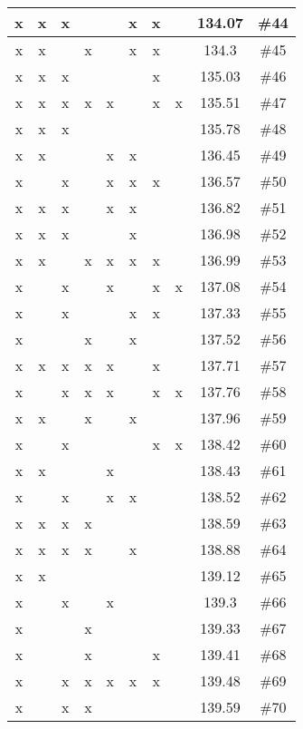 \begin{center}
\begin{longtable}{|c|c|c|c|c|c|c|c|c|c|}
 x &  x &  x &  &  &  x &  x &  & 134.07 & \#44 \\ \hline
 x &  x &  &  x &  &  x &  x &  & 134.3 & \#45 \\ \hline
 x &  x &  x &  &  &  &  x &  & 135.03 & \#46 \\ \hline
 x &  x &  x &  x &  x &  &  x &  x & 135.51 & \#47 \\ \hline
 x &  x &  x &  &  &  &  &  & 135.78 & \#48 \\ \hline
 x &  x &  &  &  x &  x &  &  & 136.45 & \#49 \\ \hline
 x &  &  x &  &  x &  x &  x &  & 136.57 & \#50 \\ \hline
 x &  x &  x &  &  x &  x &  &  & 136.82 & \#51 \\ \hline
 x &  x &  x &  &  &  x &  &  & 136.98 & \#52 \\ \hline
 x &  x &  &  x &  x &  x &  x &  & 136.99 & \#53 \\ \hline
 x &  &  x &  &  x &  &  x &  x & 137.08 & \#54 \\ \hline
 x &  &  x &  &  &  x &  x &  & 137.33 & \#55 \\ \hline
 x &  &  &  x &  &  x &  &  & 137.52 & \#56 \\ \hline
 x &  x &  x &  x &  x &  &  x &  & 137.71 & \#57 \\ \hline
 x &  &  x &  x &  x &  &  x &  x & 137.76 & \#58 \\ \hline
 x &  x &  &  x &  &  x &  &  & 137.96 & \#59 \\ \hline
 x &  &  x &  &  &  &  x &  x & 138.42 & \#60 \\ \hline
 x &  x &  &  &  x &  &  &  & 138.43 & \#61 \\ \hline
 x &  &  x &  &  x &  x &  &  & 138.52 & \#62 \\ \hline
 x &  x &  x &  x &  &  &  &  & 138.59 & \#63 \\ \hline
 x &  x &  x &  x &  &  x &  &  & 138.88 & \#64 \\ \hline
 x &  x &  &  &  &  &  &  & 139.12 & \#65 \\ \hline
 x &  &  x &  &  x &  &  &  & 139.3 & \#66 \\ \hline
 x &  &  &  x &  &  &  &  & 139.33 & \#67 \\ \hline
 x &  &  &  x &  &  &  x &  & 139.41 & \#68 \\ \hline
 x &  &  x &  x &  x &  x &  x &  & 139.48 & \#69 \\ \hline
 x &  &  x &  x &  &  &  &  & 139.59 & \#70 \\ \hline

\end{longtable}
\end{center}
